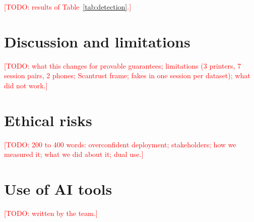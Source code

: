 \documentclass[10pt,conference,compsocconf]{IEEEtran}
\newcommand{\todo}[1]{\textcolor{red}{[TODO: #1]}}
\begin{document}

\todo{results of Table~\ref{tab:detection}.}

\section{Discussion and limitations}
\todo{what this changes for provable guarantees; limitations (3 printers, 7 session pairs, 2 phones; Scantrust frame; fakes in one session per dataset); what did not work.}

\section*{Ethical risks}
\todo{200 to 400 words: overconfident deployment; stakeholders; how we measured it; what we did about it; dual use.}




\appendix
\section*{Use of AI tools}
\todo{written by the team.}
\end{document}
